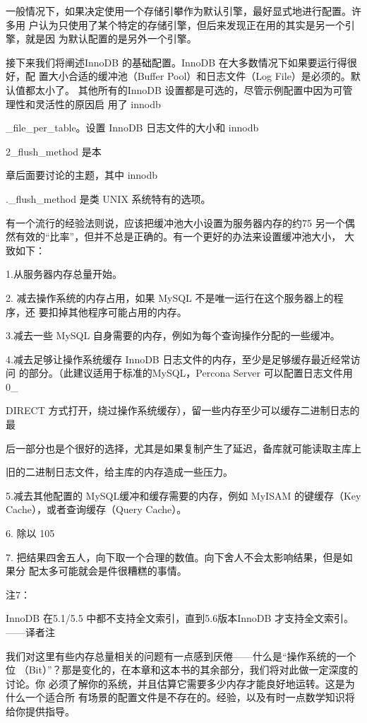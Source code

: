 一般情况下，如果决定使用一个存储引攀作为默认引擎，最好显式地进行配置。许多用
户认为只使用了某个特定的存储引擎，但后来发现正在用的其实是另一个引擎，就是因
为默认配置的是另外一个引擎。

接下来我们将阐述InnoDB 的基础配置。InnoDB 在大多数情况下如果要运行得很好，配
置大小合适的缓冲池（Buffer Pool）和日志文件（Log File）是必须的。默认值都太小了。
其他所有的InnoDB 设置都是可选的，尽管示例配置中因为可管理性和灵活性的原因启
用了 innodb

\_file\_per\_table。设置 InnoDB 日志文件的大小和 innodb

2\_flush\_method 是本

章后面要讨论的主题，其中 innodb

.\_flush\_method 是类 UNIX 系统特有的选项。

有一个流行的经验法则说，应该把缓冲池大小设置为服务器内存的约75%
另一个偶然有效的“比率”，但并不总是正确的。有一个更好的办法来设置缓冲池大小，
大致如下：

1.从服务器内存总量开始。

2. 减去操作系统的内存占用，如果 MySQL 不是唯一运行在这个服务器上的程序，还
要扣掉其他程序可能占用的内存。

3.减去一些 MySQL 自身需要的内存，例如为每个查询操作分配的一些缓冲。

4.减去足够让操作系统缓存 InnoDB 日志文件的内存，至少是足够缓存最近经常访问
的部分。（此建议适用于标准的MySQL，Percona Server 可以配置日志文件用0\_

DIRECT 方式打开，绕过操作系统缓存），留一些内存至少可以缓存二进制日志的最

后一部分也是个很好的选择，尤其是如果复制产生了延迟，备库就可能读取主库上

旧的二进制日志文件，给主库的内存造成一些压力。

5.减去其他配置的 MySQL缓冲和缓存需要的内存，例如 MyISAM 的键缓存（Key
Cache），或者查询缓存（Query Cache）。

6. 除以 105%

7. 把结果四舍五人，向下取一个合理的数值。向下舍人不会太影响结果，但是如果分
配太多可能就会是件很糟糕的事情。

注7：

InnoDB 在5.1/5.5 中都不支持全文索引，直到5.6版本InnoDB 才支持全文索引。——译者注

我们对这里有些内存总量相关的问题有一点感到厌倦——什么是“操作系统的一个位
（Bit）”？那是变化的，在本章和这本书的其余部分，我们将对此做一定深度的讨论。你
必须了解你的系统，并且估算它需要多少内存才能良好地运转。这是为什么一个适合所
有场景的配置文件是不存在的。经验，以及有时一点数学知识将给你提供指导。

